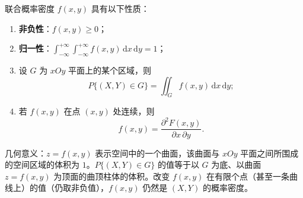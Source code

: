 ﻿\documentclass[lang=cn,11pt]{elegantbook}
\begin{document}
\begin{property}\label{prop:joint-pdf}
联合概率密度 $f(x,y)$ 具有以下性质：
\begin{enumerate}
    \item \textbf{非负性}：$f(x,y) \geqslant 0$；
    \item \textbf{归一性}：$\displaystyle\int_{-\infty}^{+\infty}\int_{-\infty}^{+\infty}f(x,y)\,\mathrm{d}x\,\mathrm{d}y = 1$；
    \item 设 $G$ 为 $xOy$ 平面上的某个区域，则
    \[
    P\{(X,Y) \in G\} = \iint_G f(x,y)\,\mathrm{d}x\,\mathrm{d}y;
    \]
    \item 若 $f(x,y)$ 在点 $(x,y)$ 处连续，则
    \[
    f(x,y) = \frac{\partial^2 F(x,y)}{\partial x\,\partial y}.
    \]
\end{enumerate}
\end{property}

\begin{note}
几何意义：$z = f(x,y)$ 表示空间中的一个曲面，该曲面与 $xOy$ 平面之间所围成的空间区域的体积为 $1$。$P\{(X,Y) \in G\}$ 的值等于以 $G$ 为底、以曲面 $z = f(x,y)$ 为顶面的曲顶柱体的体积。改变 $f(x,y)$ 在有限个点（甚至一条曲线上）的值（仍取非负值），$f(x,y)$ 仍然是 $(X,Y)$ 的概率密度。
\end{note}
\end{document}
